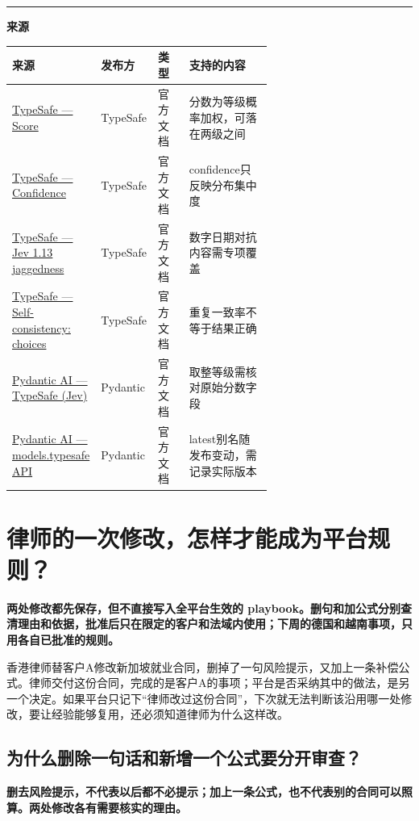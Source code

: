 \documentclass[a4paper,11pt]{ctexart}
\begin{document}
\bigskip\noindent\rule{\linewidth}{0.4pt}\par\smallskip
\begingroup\footnotesize\color{slate}
\textbf{来源}\par\smallskip
\setlength{\tabcolsep}{4pt}\renewcommand{\arraystretch}{1.2}\keepXColumns
\begin{tabularx}{\linewidth}{L{0.32\linewidth} L{0.20\linewidth} L{0.12\linewidth} X}
\toprule
\textbf{来源} & \textbf{发布方} & \textbf{类型} & \textbf{支持的内容} \\
\midrule
\href{https://docs.typesafe.ai/primitives/score.md}{TypeSafe — Score} & TypeSafe & 官方文档 & 分数为等级概率加权，可落在两级之间 \\
\href{https://docs.typesafe.ai/confidence.md}{TypeSafe — Confidence} & TypeSafe & 官方文档 & confidence只反映分布集中度 \\
\href{https://docs.typesafe.ai/model-jaggedness/jev-1.13.md}{TypeSafe — Jev 1.13 jaggedness} & TypeSafe & 官方文档 & 数字日期对抗内容需专项覆盖 \\
\href{https://docs.typesafe.ai/cookbooks/consistency_choice_cookbook.md}{TypeSafe — Self-consistency: choices} & TypeSafe & 官方文档 & 重复一致率不等于结果正确 \\
\href{https://pydantic.dev/docs/ai/models/typesafe/}{Pydantic AI — TypeSafe (Jev)} & Pydantic & 官方文档 & 取整等级需核对原始分数字段 \\
\href{https://pydantic.dev/docs/ai/api/models/typesafe/}{Pydantic AI — models.typesafe API} & Pydantic & 官方文档 & latest别名随发布变动，需记录实际版本 \\
\bottomrule
\end{tabularx}
\endgroup

\clearpage
\section{律师的一次修改，怎样才能成为平台规则？}
\noindent\textbf{两处修改都先保存，但不直接写入全平台生效的 playbook。删句和加公式分别查清理由和依据，批准后只在限定的客户和法域内使用；下周的德国和越南事项，只用各自已批准的规则。}\par\medskip

香港律师替客户A修改新加坡就业合同，删掉了一句风险提示，又加上一条补偿公式。律师交付这份合同，完成的是客户A的事项；平台是否采纳其中的做法，是另一个决定。如果平台只记下“律师改过这份合同”，下次就无法判断该沿用哪一处修改，要让经验能够复用，还必须知道律师为什么这样改。

\subsection{为什么删除一句话和新增一个公式要分开审查？}
\noindent\textbf{删去风险提示，不代表以后都不必提示；加上一条公式，也不代表别的合同可以照算。两处修改各有需要核实的理由。}\par\medskip
\end{document}
